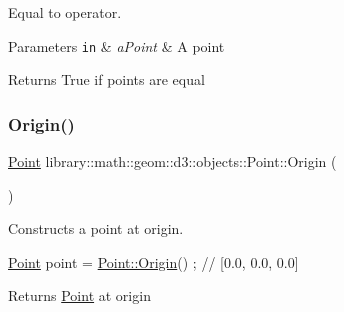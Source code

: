 Equal to operator. 


\begin{DoxyParams}[1]{Parameters}
\mbox{\tt in}  & {\em a\+Point} & A point \\
\hline
\end{DoxyParams}
\begin{DoxyReturn}{Returns}
True if points are equal 
\end{DoxyReturn}
\mbox{\label{classlibrary_1_1math_1_1geom_1_1d3_1_1objects_1_1_point_ab2a38e285c562e50bf350272c083986f}} 
\subsubsection{\texorpdfstring{Origin()}{Origin()}}
{\footnotesize\ttfamily \hyperlink{classlibrary_1_1math_1_1geom_1_1d3_1_1objects_1_1_point}{Point} library\+::math\+::geom\+::d3\+::objects\+::\+Point\+::\+Origin (\begin{DoxyParamCaption}{ }\end{DoxyParamCaption})\hspace{0.3cm}{\ttfamily [static]}}



Constructs a point at origin. 


\begin{DoxyCode}
\hyperlink{classlibrary_1_1math_1_1geom_1_1d3_1_1objects_1_1_point_a617e690ab6091af3de729cee337e309e}{Point} point = \hyperlink{classlibrary_1_1math_1_1geom_1_1d3_1_1objects_1_1_point_ab2a38e285c562e50bf350272c083986f}{Point::Origin}() ; \textcolor{comment}{// [0.0, 0.0, 0.0]}
\end{DoxyCode}


\begin{DoxyReturn}{Returns}
\hyperlink{classlibrary_1_1math_1_1geom_1_1d3_1_1objects_1_1_point}{Point} at origin 
\end{DoxyReturn}
\mbox{\label{classlibrary_1_1math_1_1geom_1_1d3_1_1objects_1_1_point_a4e3c9900e358664fbdfe4d82c7fe40c1}} 

